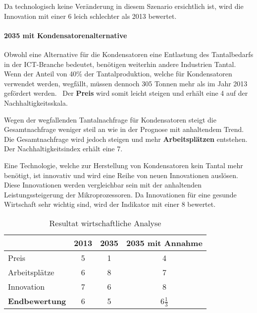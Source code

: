 Da technologisch keine Veränderung in diesem Szenario ersichtlich ist, wird die Innovation mit einer 6 leich schlechter als 2013 bewertet.

\paragraph{2035 mit Kondensatorenalternative}
Obwohl eine Alternative für die Kondensatoren eine Entlastung des Tantalbedarfs in der ICT-Branche bedeutet, benötigen weiterhin andere Industrien Tantal. Wenn der Anteil von 40\% der Tantalproduktion, welche für Kondensatoren verwendet werden, wegfällt, müssen dennoch 305 Tonnen mehr als im Jahr 2013 gefördert werden.~\cite{tantal_price2} Der \textbf{Preis} wird somit leicht steigen und erhält eine 4 auf der Nachhaltigkeitsskala.

Wegen der wegfallenden Tantalnachfrage für Kondensatoren steigt die Gesamtnachfrage weniger steil an wie in der Prognose mit anhaltendem Trend. Die Gesamtnachfrage wird jedoch steigen und mehr \textbf{Arbeitsplätzen} entstehen. Der Nachhaltigkeitsindex erhält eine 7.

Eine Technologie, welche zur Herstellung von Kondensatoren kein Tantal mehr benötigt, ist innovativ und wird eine Reihe von neuen Innovationen auslösen. Diese Innovationen werden vergleichbar sein mit der anhaltenden Leistungssteigerung der Mikroprozessoren. Da Innovationen für eine gesunde Wirtschaft sehr wichtig sind, wird der Indikator mit einer 8 bewertet.

\begin{table}[h]
  \centering
  \begin{tabular}{l|ccc}            & \textbf{2013} & \textbf{2035} & \textbf{2035 mit Annahme}
    \\ \hline Preis                 & 5             & 1             & 4
    \\ Arbeitsplätze                & 6             & 8             & 7
    \\ Innovation                   & 7             & 6             & 8
    \\ \hline \textbf{Endbewertung} & 6             & 5             & 6\(\frac{1}{3}\)
  \end{tabular}
  \caption{Resultat wirtschaftliche Analyse}
\end{table}
